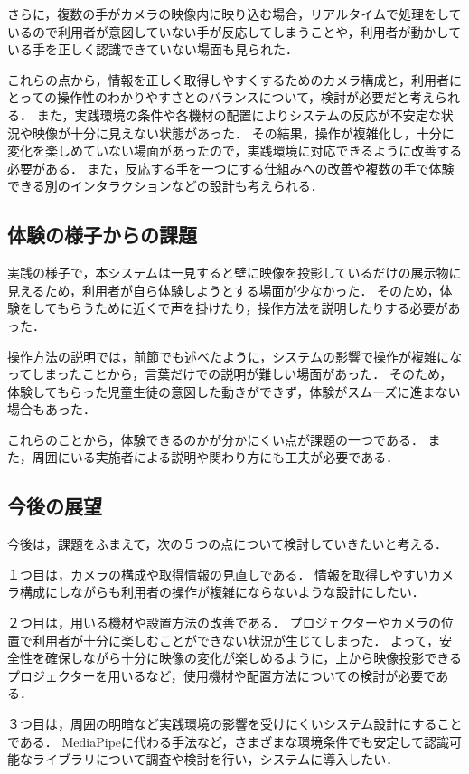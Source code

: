 さらに，複数の手がカメラの映像内に映り込む場合，リアルタイムで処理をしているので利用者が意図していない手が反応してしまうことや，利用者が動かしている手を正しく認識できていない場面も見られた．

これらの点から，情報を正しく取得しやすくするためのカメラ構成と，利用者にとっての操作性のわかりやすさとのバランスについて，検討が必要だと考えられる．
また，実践環境の条件や各機材の配置によりシステムの反応が不安定な状況や映像が十分に見えない状態があった．
その結果，操作が複雑化し，十分に変化を楽しめていない場面があったので，実践環境に対応できるように改善する必要がある．
また，反応する手を一つにする仕組みへの改善や複数の手で体験できる別のインタラクションなどの設計も考えられる．

\subsection{体験の様子からの課題}
実践の様子で，本システムは一見すると壁に映像を投影しているだけの展示物に見えるため，利用者が自ら体験しようとする場面が少なかった．
そのため，体験をしてもらうために近くで声を掛けたり，操作方法を説明したりする必要があった．

操作方法の説明では，前節でも述べたように，システムの影響で操作が複雑になってしまったことから，言葉だけでの説明が難しい場面があった．
そのため，体験してもらった児童生徒の意図した動きができず，体験がスムーズに進まない場合もあった．

これらのことから，体験できるのかが分かにくい点が課題の一つである．
また，周囲にいる実施者による説明や関わり方にも工夫が必要である．


\subsection{今後の展望}
今後は，課題をふまえて，次の５つの点について検討していきたいと考える．

１つ目は，カメラの構成や取得情報の見直しである．
情報を取得しやすいカメラ構成にしながらも利用者の操作が複雑にならないような設計にしたい．

２つ目は，用いる機材や設置方法の改善である．
プロジェクターやカメラの位置で利用者が十分に楽しむことができない状況が生じてしまった．
よって，安全性を確保しながら十分に映像の変化が楽しめるように，上から映像投影できるプロジェクターを用いるなど，使用機材や配置方法についての検討が必要である．

３つ目は，周囲の明暗など実践環境の影響を受けにくいシステム設計にすることである．
MediaPipeに代わる手法など，さまざまな環境条件でも安定して認識可能なライブラリについて調査や検討を行い，システムに導入したい．

